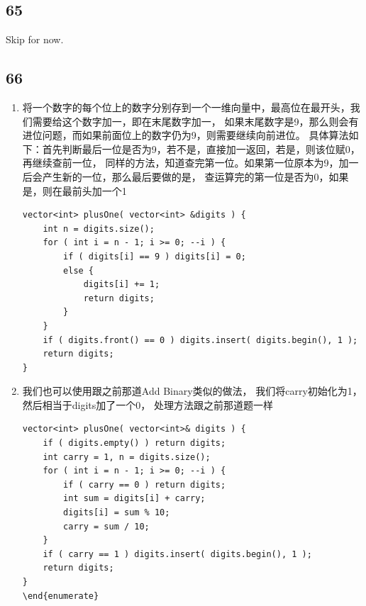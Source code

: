 \documentclass[12pt,a4paper]{article}
\begin{document}
\subsection{65}
Skip for now. 

\subsection{66}
\begin{enumerate}
\item
\begin{CJK}{UTF8}{gbsn}
将一个数字的每个位上的数字分别存到一个一维向量中，最高位在最开头，我们需要给这个数字加一，即在末尾数字加一，
如果末尾数字是9，那么则会有进位问题，而如果前面位上的数字仍为9，则需要继续向前进位。
具体算法如下：首先判断最后一位是否为9，若不是，直接加一返回，若是，则该位赋0，再继续查前一位，
同样的方法，知道查完第一位。如果第一位原本为9，加一后会产生新的一位，那么最后要做的是，
查运算完的第一位是否为0，如果是，则在最前头加一个1
\end{CJK}
\begin{lstlisting}
vector<int> plusOne( vector<int> &digits ) {
	int n = digits.size();
	for ( int i = n - 1; i >= 0; --i ) {
		if ( digits[i] == 9 ) digits[i] = 0;
		else {
			digits[i] += 1;
			return digits;
		}
	}
	if ( digits.front() == 0 ) digits.insert( digits.begin(), 1 );
	return digits;
}
\end{lstlisting}
\item
\begin{CJK}{UTF8}{gbsn}
我们也可以使用跟之前那道Add Binary类似的做法，
我们将carry初始化为1，然后相当于digits加了一个0，
处理方法跟之前那道题一样
\end{CJK}
\begin{lstlisting}
vector<int> plusOne( vector<int>& digits ) {
	if ( digits.empty() ) return digits;
	int carry = 1, n = digits.size();
	for ( int i = n - 1; i >= 0; --i ) {
		if ( carry == 0 ) return digits;
		int sum = digits[i] + carry;
		digits[i] = sum % 10;
		carry = sum / 10;
	}
	if ( carry == 1 ) digits.insert( digits.begin(), 1 );
	return digits;
}
\end{enumerate}


\end{lstlisting}
\end{enumerate}
\end{document}
